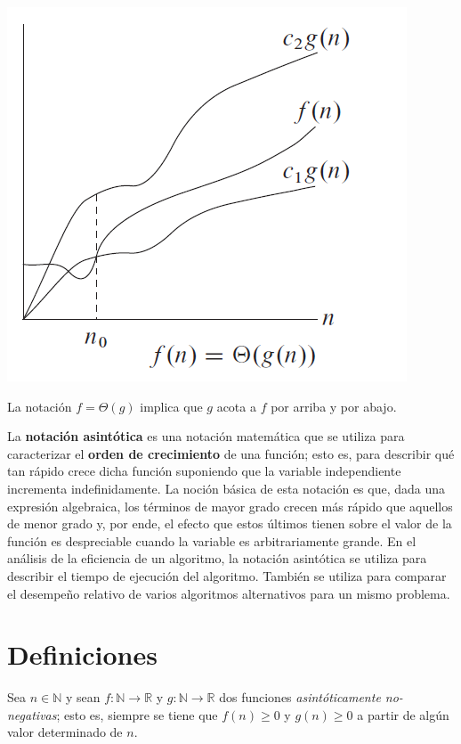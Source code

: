 \begin{marginfigure}
  \includegraphics[width=\linewidth]{figuras/big-theta}
  \caption{La notación \(f=\Theta(g)\) implica que \(g\) acota a \(f\) por arriba y por abajo.}
\end{marginfigure}

La \textbf{notación asintótica} es una notación matemática que se utiliza para caracterizar el \textbf{orden de crecimiento} de una función; esto es, para describir qué tan rápido crece dicha función suponiendo que la variable independiente incrementa indefinidamente.
La noción básica de esta notación es que, dada una expresión algebraica, los términos de mayor grado crecen más rápido que aquellos de menor grado y, por ende, el efecto que estos últimos tienen sobre el valor de la función es despreciable cuando la variable es arbitrariamente grande. 
En el análisis de la eficiencia de un algoritmo, la notación asintótica se utiliza para describir el tiempo de ejecución del algoritmo.
También se utiliza para comparar el desempeño relativo de varios algoritmos alternativos para un mismo problema.

\section{Definiciones}

Sea \(n\in\mathbb{N}\) y sean \(f:\mathbb{N}\to\mathbb{R}\) y \(g:\mathbb{N}\to\mathbb{R}\) dos funciones \emph{asintóticamente no-negativas}; esto es, siempre se tiene que \(f(n)\geq 0\) y \(g(n)\geq 0\) a partir de algún valor determinado de \(n\). 

